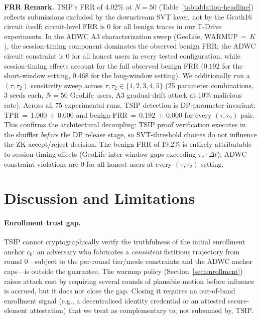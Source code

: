\documentclass[conference]{IEEEtran}
\theoremstyle{definition}
\theoremstyle{plain}
\begin{document}
\noindent\textbf{FRR Remark.}
\textsc{TSIP}'s FRR of $4.02\%$ at $N{=}50$
(Table~\ref{tab:ablation-headline}) reflects submissions excluded by the
downstream SVT layer, not by the Groth16 circuit itself: circuit-level FRR
is 0 for all benign traces in our T-Drive experiments.
In the ADWC A3 characterization sweep (GeoLife, WARMUP$\,{=}\,K$), the
session-timing component dominates the observed benign FRR;
the ADWC circuit constraint is 0 for all honest
users in every tested configuration, while session-timing effects
account for the full observed benign FRR ($0.192$ for the short-window setting, $0.468$ for the long-window setting).
We additionally run a $(\tau, \tau_2)$ sensitivity sweep across
$\tau, \tau_2 \in \{1,2,3,4,5\}$ (25 parameter combinations, 3 seeds each,
$N{=}50$ GeoLife users, A3 gradual-drift attack at 10\% malicious rate).
Across all 75 experimental runs, TSIP detection is DP-parameter-invariant:
TPR$\,=\,1.000\,{\pm}\,0.000$ and benign-FRR$\,=\,0.192\,{\pm}\,0.000$
for every $(\tau, \tau_2)$ pair.
This confirms the architectural decoupling: TSIP proof verification executes
in the shuffler \emph{before} the DP release stage, so SVT-threshold choices
do not influence the ZK accept/reject decision.
The benign FRR of 19.2\% is entirely attributable to
session-timing effects (GeoLife inter-window gaps exceeding
$\tau_u\!\cdot\!\Delta t$); ADWC-constraint violations are 0 for all honest
users at every $(\tau,\tau_2)$ setting.

\section{Discussion and Limitations}
\label{sec:discussion}

\paragraph{Enrollment trust gap.}
\textsc{TSIP} cannot cryptographically verify the truthfulness of the
initial enrollment anchor $c_0$: an adversary who fabricates a
\emph{consistent} fictitious trajectory from round 0---subject to the
per-round tier/mode constraints and the ADWC anchor caps---is outside
the guarantee. The warmup policy (Section~\ref{sec:enrollment}) raises attack
cost by requiring several rounds of plausible motion before influence
is accrued, but it does not close the gap. Closing it requires an
out-of-band enrollment signal (e.g., a decentralised identity credential
or an attested secure-element attestation) that we treat as complementary
to, not subsumed by, \textsc{TSIP}.
\end{document}

